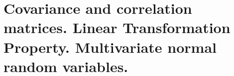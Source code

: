 \chapter[Covariance matrices. Multivariate normals.]{Covariance and correlation matrices. Linear Transformation Property. Multivariate normal random variables.}
\label{ch:07}


















